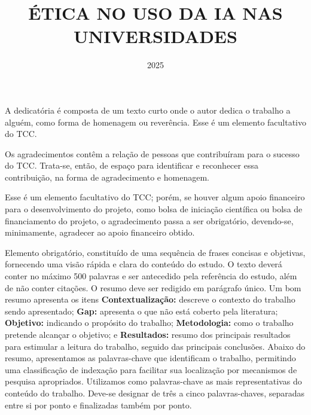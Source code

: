 \documentclass{eic-bcc-tcc}
\title{ÉTICA NO USO DA IA NAS UNIVERSIDADES}
\date{2025}
\begin{document}
\maketitle

\begin{dedicatoria}
A dedicatória é composta de um texto curto onde o autor dedica o trabalho a alguém, como forma de homenagem ou reverência. Esse é um elemento facultativo do TCC.
\end{dedicatoria}


\begin{agradecimentos}
Os agradecimentos contêm a relação de pessoas que contribuíram para o sucesso do TCC.
Trata-se, então, de espaço para identificar e reconhecer essa contribuição, na forma de agradecimento e homenagem.

Esse é um elemento facultativo do TCC; porém, se houver algum apoio financeiro para o desenvolvimento do projeto, como bolsa de iniciação científica ou bolsa de financiamento do projeto, o agradecimento passa a ser obrigatório, devendo-se, minimamente, agradecer ao apoio financeiro obtido.
\end{agradecimentos}


\makeapproval


\begin{resumo}
Elemento obrigatório, constituído de uma sequência de frases concisas e objetivas, fornecendo uma visão rápida e clara do conteúdo do estudo. O texto deverá conter no máximo 500 palavras e ser antecedido pela referência do estudo, além de não conter citações. O resumo deve ser redigido em parágrafo único.
Um bom resumo apresenta os itens 
\textbf{Contextualização:} descreve o contexto do trabalho sendo apresentado; 
\textbf{Gap:} apresenta o que não está coberto pela literatura; 
\textbf{Objetivo:} indicando o propósito do trabalho; 
\textbf{Metodologia:} como o trabalho pretende alcançar o objetivo; e 
\textbf{Resultados:} resumo dos principais resultados para estimular a leitura do trabalho, seguido das principais conclusões.
Abaixo do resumo, apresentamos as palavras-chave que identificam o trabalho, permitindo uma classificação de indexação para facilitar sua localização por mecanismos de pesquisa apropriados. Utilizamos como palavras-chave as mais representativas do conteúdo do trabalho. Deve-se designar de três a cinco palavras-chaves, separadas entre si por ponto e finalizadas também por ponto.

\end{resumo}
\end{document}
